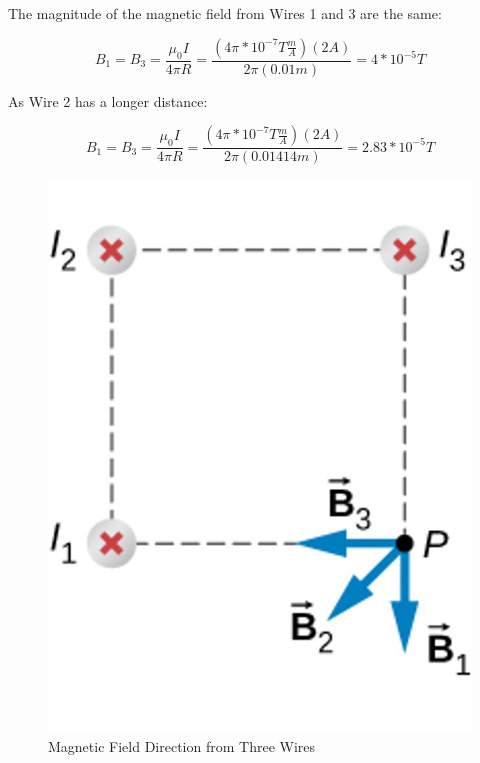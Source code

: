 \documentclass[14pt]{memoir}
\begin{document}
The magnitude of the magnetic field from Wires 1 and 3 are the same:

\begin{equation}
B_1 = B_3 = \frac{\mu_0 I}{4\pi R} = \frac{(4\pi * 10^{-7} T \frac{m}{A})(2A)}{2 \pi (0.01m)} = 4 * 10^{-5} T
\end{equation}

As Wire 2 has a longer distance:

\begin{equation}
B_1 = B_3 = \frac{\mu_0 I}{4\pi R} = \frac{(4\pi * 10^{-7} T \frac{m}{A})(2A)}{2 \pi (0.01414m)} = 2.83 * 10^{-5} T
\end{equation}

\begin{figure}[H]
\begin{center}
\includegraphics[scale=0.50]{fig/fig_12_08b.jpg}
\caption{Magnetic Field Direction from Three Wires}
\label{fig:12_08b}
\end{center}
\end{figure}
\end{document}
